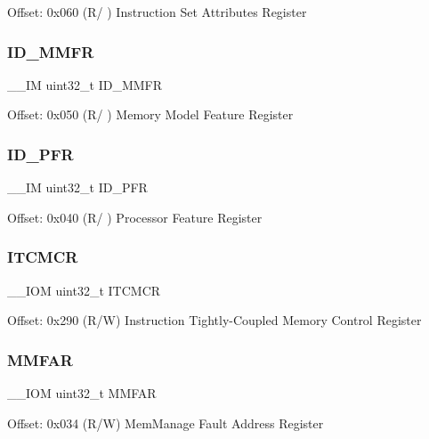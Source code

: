 Offset\+: 0x060 (R/ ) Instruction Set Attributes Register \mbox{\label{struct_s_c_b___type_a2337a27929a11c9ef8d3ec77cf12255a}} 
\subsubsection{\texorpdfstring{ID\_MMFR}{ID\_MMFR}}
{\footnotesize\ttfamily \+\_\+\+\_\+\+IM uint32\+\_\+t I\+D\+\_\+\+M\+M\+FR}

Offset\+: 0x050 (R/ ) Memory Model Feature Register \mbox{\label{struct_s_c_b___type_a294fd7c7494a55a8f25b0a6333939473}} 
\subsubsection{\texorpdfstring{ID\_PFR}{ID\_PFR}}
{\footnotesize\ttfamily \+\_\+\+\_\+\+IM uint32\+\_\+t I\+D\+\_\+\+P\+FR}

Offset\+: 0x040 (R/ ) Processor Feature Register \mbox{\label{struct_s_c_b___type_a18d1734811b40e7edf6e5213bf336ca8}} 
\subsubsection{\texorpdfstring{ITCMCR}{ITCMCR}}
{\footnotesize\ttfamily \+\_\+\+\_\+\+I\+OM uint32\+\_\+t I\+T\+C\+M\+CR}

Offset\+: 0x290 (R/W) Instruction Tightly-\/\+Coupled Memory Control Register \mbox{\label{struct_s_c_b___type_ae9d94d186615d57d38c9253cb842d244}} 
\subsubsection{\texorpdfstring{MMFAR}{MMFAR}}
{\footnotesize\ttfamily \+\_\+\+\_\+\+I\+OM uint32\+\_\+t M\+M\+F\+AR}

Offset\+: 0x034 (R/W) Mem\+Manage Fault Address Register \mbox{\label{struct_s_c_b___type_a9b0103b438c8922eaea5624f71afbbc8}} 
